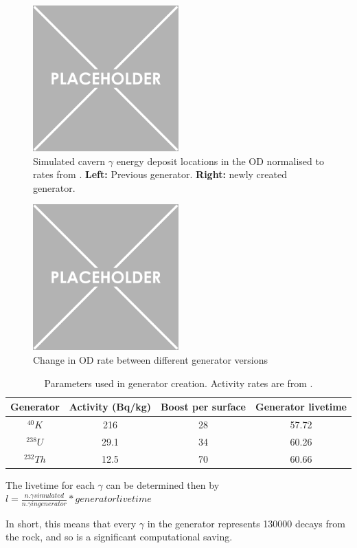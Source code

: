 \begin{figure}[!htbp]
    \centering
    \includegraphics[width=0.5\textwidth]{Figures/Placeholder.png}
    \caption{Simulated cavern $\gamma$ energy deposit locations in the OD normalised to rates from \cite{LZ_Gamma_Ray_Background_ref}. \textbf{Left:} Previous generator. \textbf{Right:} newly created generator.}
    \label{fig:cavern_gamma_position_distribution}
\end{figure}


\par


\begin{figure}[!htbp]
    \centering
    \includegraphics[width=0.5\textwidth]{Figures/Placeholder.png}
    \caption{Change in OD rate between different generator versions}
    \label{fig:cavern_gamma_rate_difference}
\end{figure}



\begin{table}[!htbp]
    \centering
    \begin{tabular}{c|c|c|c}
        Generator    & Activity (Bq/kg) & Boost per surface & Generator livetime   \\ \hline
        ${}^{40}K$   & 216              & 28                & 57.72                \\
        ${}^{238}U$  & 29.1             & 34                & 60.26                \\
        ${}^{232}Th$ & 12.5             & 70                & 60.66
    \end{tabular}
    \caption{Parameters used in generator creation. Activity rates are from \cite{LZ_Gamma_Ray_Background_ref}.}
    \label{tab:cavern_gamma_generator_parameters}
\end{table}

\par
The livetime for each $\gamma$ can be determined then by $l = \frac{n. \gamma simulated}{n. \gamma in generator} * generator livetime$

\par
In short, this means that every $\gamma$ in the generator represents 130000 decays from the rock, and so is a significant computational saving.